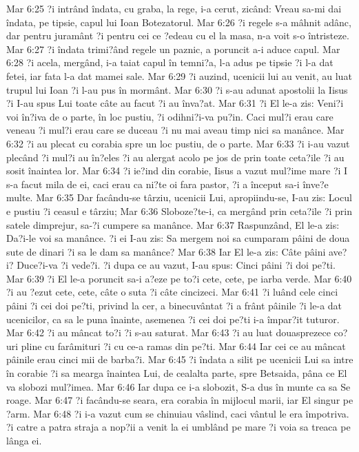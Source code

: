 Mar 6:25  ?i intrând îndata, cu graba, la rege, i-a cerut, zicând: Vreau sa-mi dai îndata, pe tipsie, capul lui Ioan Botezatorul.
Mar 6:26  ?i regele s-a mâhnit adânc, dar pentru juramânt ?i pentru cei ce ?edeau cu el la masa, n-a voit s-o întristeze.
Mar 6:27  ?i îndata trimi?ând regele un paznic, a poruncit a-i aduce capul.
Mar 6:28  ?i acela, mergând, i-a taiat capul în temni?a, l-a adus pe tipsie ?i l-a dat fetei, iar fata l-a dat mamei sale.
Mar 6:29  ?i auzind, ucenicii lui au venit, au luat trupul lui Ioan ?i l-au pus în mormânt.
Mar 6:30  ?i s-au adunat apostolii la Iisus ?i I-au spus Lui toate câte au facut ?i au înva?at.
Mar 6:31  ?i El le-a zis: Veni?i voi în?iva de o parte, în loc pustiu, ?i odihni?i-va pu?in. Caci mul?i erau care veneau ?i mul?i erau care se duceau ?i nu mai aveau timp nici sa manânce.
Mar 6:32  ?i au plecat cu corabia spre un loc pustiu, de o parte.
Mar 6:33  ?i i-au vazut plecând ?i mul?i au în?eles ?i au alergat acolo pe jos de prin toate ceta?ile ?i au sosit înaintea lor.
Mar 6:34  ?i ie?ind din corabie, Iisus a vazut mul?ime mare ?i I s-a facut mila de ei, caci erau ca ni?te oi fara pastor, ?i a început sa-i înve?e multe.
Mar 6:35  Dar facându-se târziu, ucenicii Lui, apropiindu-se, I-au zis: Locul e pustiu ?i ceasul e târziu;
Mar 6:36  Sloboze?te-i, ca mergând prin ceta?ile ?i prin satele dimprejur, sa-?i cumpere sa manânce.
Mar 6:37  Raspunzând, El le-a zis: Da?i-le voi sa manânce. ?i ei I-au zis: Sa mergem noi sa cumparam pâini de doua sute de dinari ?i sa le dam sa manânce?
Mar 6:38  Iar El le-a zis: Câte pâini ave?i? Duce?i-va ?i vede?i. ?i dupa ce au vazut, I-au spus: Cinci pâini ?i doi pe?ti.
Mar 6:39  ?i El le-a poruncit sa-i a?eze pe to?i cete, cete, pe iarba verde.
Mar 6:40  ?i au ?ezut cete, cete, câte o suta ?i câte cincizeci.
Mar 6:41  ?i luând cele cinci pâini ?i cei doi pe?ti, privind la cer, a binecuvântat ?i a frânt pâinile ?i le-a dat ucenicilor, ca sa le puna înainte, asemenea ?i cei doi pe?ti i-a împar?it tuturor.
Mar 6:42  ?i au mâncat to?i ?i s-au saturat.
Mar 6:43  ?i au luat douasprezece co?uri pline cu farâmituri ?i cu ce-a ramas din pe?ti.
Mar 6:44  Iar cei ce au mâncat pâinile erau cinci mii de barba?i.
Mar 6:45  ?i îndata a silit pe ucenicii Lui sa intre în corabie ?i sa mearga înaintea Lui, de cealalta parte, spre Betsaida, pâna ce El va slobozi mul?imea.
Mar 6:46  Iar dupa ce i-a slobozit, S-a dus în munte ca sa Se roage.
Mar 6:47  ?i facându-se seara, era corabia în mijlocul marii, iar El singur pe ?arm.
Mar 6:48  ?i i-a vazut cum se chinuiau vâslind, caci vântul le era împotriva. ?i catre a patra straja a nop?ii a venit la ei umblând pe mare ?i voia sa treaca pe lânga ei.
